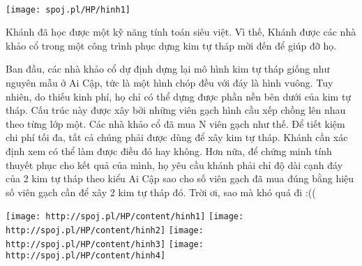  


\texttt{[image: spoj.pl/HP/hinh1]}

Khánh đã học được một kỹ năng tính toán siêu việt. Vì thế, Khánh được các nhà khảo cổ trong một công trình phục dựng kim tự tháp mời đến để giúp đỡ họ.

Ban đầu, các nhà khảo cổ dự định dựng lại mô hình kim tự tháp giống như nguyên mẫu ở Ai Cập, tức là một hình chóp đều với đáy là hình vuông. Tuy nhiên, do thiếu kinh phí, họ chỉ có thể dựng được phần nền bên dưới của kim tự tháp. Cấu trúc này được xây bởi những viên gạch hình cầu xếp chồng lên nhau theo từng lớp một. Các nhà khảo cổ đã mua N viên gạch như thế. Để tiết kiệm chi phí tối đa, tất cả chúng phải được dùng để xây kim tự tháp. Khánh cần xác định xem có thể làm được điều đó hay không. Hơn nữa, để chứng minh tính thuyết phục cho kết quả của mình, họ yêu cầu khánh phải chỉ độ dài cạnh đáy của 2 kim tự tháp theo kiểu Ai Cập sao cho số viên gạch đã mua đúng bằng hiệu số viên gạch cần để xây 2 kim tự tháp đó. Trời ơi, sao mà khó quá đi :((


\texttt{[image: http://spoj.pl/HP/content/hinh1]}
\texttt{[image: http://spoj.pl/HP/content/hinh2]}
\texttt{[image: http://spoj.pl/HP/content/hinh3]}
\texttt{[image: http://spoj.pl/HP/content/hinh4]}

 